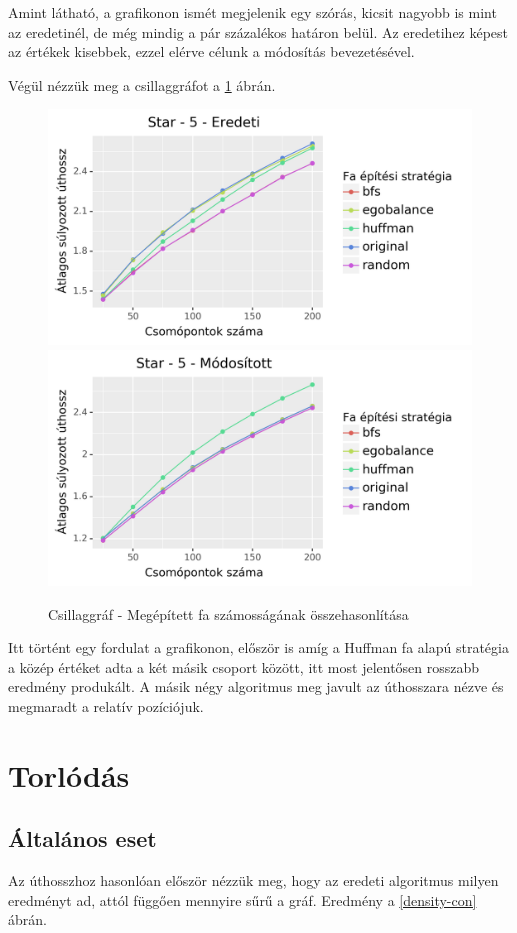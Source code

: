 \documentclass[12pt]{report}
\begin{document}
Amint látható, a grafikonon ismét megjelenik egy szórás, kicsit nagyobb is mint az eredetinél, de még mindig a pár százalékos határon belül. 
Az eredetihez képest az értékek kisebbek, ezzel elérve célunk a módosítás bevezetésével.

Végül nézzük meg a csillaggráfot a \ref{star-tree-difference-len} ábrán. 

\begin{figure}[H]
	\begin{center}
		\includegraphics[width=0.49\linewidth]{pictures/star_len_e.png}
		\includegraphics[width=0.49\linewidth]{pictures/star_len_m.png}
		\caption{Csillaggráf - Megépített fa számosságának összehasonlítása}
		\label{star-tree-difference-len}
	\end{center}
\end{figure}

Itt történt egy fordulat a grafikonon, először is amíg a Huffman fa alapú stratégia a közép értéket adta a két másik csoport között, itt most jelentősen rosszabb eredmény produkált.
A másik négy algoritmus meg javult az úthosszara nézve és megmaradt a relatív pozíciójuk.

\section{Torlódás}

\subsection{Általános eset}

Az úthosszhoz hasonlóan először nézzük meg, hogy az eredeti algoritmus milyen eredményt ad, attól függően mennyire sűrű a gráf.
Eredmény a \ref{density-con} ábrán.
\end{document}
